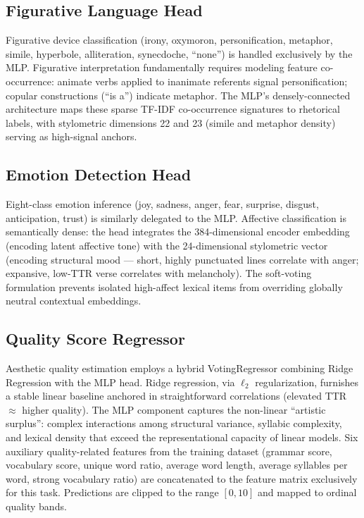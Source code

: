 \documentclass[conference]{IEEEtran}
\begin{document}
\subsection{Figurative Language Head}

Figurative device classification (irony, oxymoron, personification,
metaphor, simile, hyperbole, alliteration, synecdoche, ``none'') is
handled exclusively by the MLP. Figurative interpretation fundamentally
requires modeling feature co-occurrence: animate verbs applied to
inanimate referents signal personification; copular constructions (``is
a'') indicate metaphor. The MLP's densely-connected architecture maps
these sparse TF-IDF co-occurrence signatures to rhetorical labels, with
stylometric dimensions 22 and 23 (simile and metaphor density) serving
as high-signal anchors.

\subsection{Emotion Detection Head}

Eight-class emotion inference (joy, sadness, anger, fear, surprise,
disgust, anticipation, trust) is similarly delegated to the MLP.
Affective classification is semantically dense: the head integrates the
384-dimensional encoder embedding (encoding latent affective tone) with
the 24-dimensional stylometric vector (encoding structural mood ---
short, highly punctuated lines correlate with anger; expansive, low-TTR
verse correlates with melancholy). The soft-voting formulation prevents
isolated high-affect lexical items from overriding globally neutral
contextual embeddings.

\subsection{Quality Score Regressor}

Aesthetic quality estimation employs a hybrid VotingRegressor combining
Ridge Regression with the MLP head. Ridge regression, via $\ell_2$
regularization, furnishes a stable linear baseline anchored in
straightforward correlations (elevated TTR $\approx$ higher quality).
The MLP component captures the non-linear ``artistic surplus'': complex
interactions among structural variance, syllabic complexity, and lexical
density that exceed the representational capacity of linear models. Six
auxiliary quality-related features from the training dataset (grammar
score, vocabulary score, unique word ratio, average word length, average
syllables per word, strong vocabulary ratio) are concatenated to the
feature matrix exclusively for this task. Predictions are clipped to the
range $[0, 10]$ and mapped to ordinal quality bands.
\end{document}

